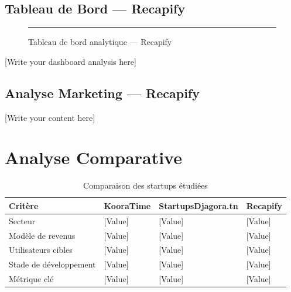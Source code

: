 \subsection{Tableau de Bord — Recapify}
\label{sec:recapify-dashboard}

\begin{figure}[H]
  \centering
  \rule{0.95\textwidth}{6cm} %
  \caption{Tableau de bord analytique — Recapify}
  \label{fig:recapify-dashboard}
\end{figure}

[Write your dashboard analysis here]

\subsection{Analyse Marketing — Recapify}
\label{sec:recapify-marketing}

[Write your content here]


\section{Analyse Comparative}
\label{sec:comparative-analysis}

\begin{table}[H]
  \centering
  \caption{Comparaison des startups étudiées}
  \label{tab:startup-comparison}
  \begin{tabularx}{\textwidth}{l X X X}
    \toprule
    \textbf{Critère}       & \textbf{KooraTime}  & \textbf{StartupsDjagora.tn} & \textbf{Recapify} \\
    \midrule
    Secteur                & [Value]             & [Value]                     & [Value] \\
    Modèle de revenus      & [Value]             & [Value]                     & [Value] \\
    Utilisateurs cibles    & [Value]             & [Value]                     & [Value] \\
    Stade de développement & [Value]             & [Value]                     & [Value] \\
    Métrique clé           & [Value]             & [Value]                     & [Value] \\
    \bottomrule
  \end{tabularx}
\end{table}

